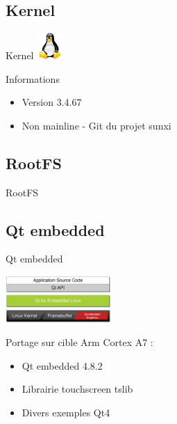 \documentclass[11pt]{beamer}
\begin{document}
	\subsection{Kernel}
	\begin{frame}{Kernel}
	\includegraphics[width=1cm]{commons/tux.png}
		\begin{block}{Informations}
		\begin{itemize}
			\item Version 3.4.67
			\item Non mainline - Git du projet sunxi
			\href{https://github.com/linux-sunxi/linux-sunxi}{}
		\end{itemize}
	\end{block}
	\end{frame}
	
	\subsection{RootFS}
	\begin{frame}{RootFS}
		\begin{center}
			
		\end{center}
	\end{frame}
	
	\subsection{Qt embedded}
	\begin{frame}{Qt embedded}
		\begin{center}
			  \includegraphics[width=4cm]{commons/qt-embedded-linux-architecture.png}
		\end{center}
			  Portage sur cible Arm Cortex A7 : 
		\begin{itemize}
			  \item Qt embedded 4.8.2
			  \item Librairie touchscreen tslib
			  \item Divers exemples Qt4
		\end{itemize}
	\end{frame}
	
\end{document}

